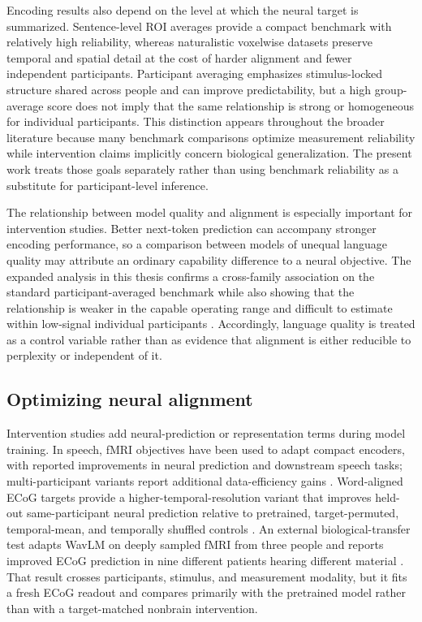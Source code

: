 Encoding results also depend on the level at which the neural target is summarized.
Sentence-level ROI averages provide a compact benchmark with relatively high reliability, whereas naturalistic voxelwise datasets preserve temporal and spatial detail at the cost of harder alignment and fewer independent participants.
Participant averaging emphasizes stimulus-locked structure shared across people and can improve predictability, but a high group-average score does not imply that the same relationship is strong or homogeneous for individual participants.
This distinction appears throughout the broader literature because many benchmark comparisons optimize measurement reliability while intervention claims implicitly concern biological generalization.
The present work treats those goals separately rather than using benchmark reliability as a substitute for participant-level inference.

The relationship between model quality and alignment is especially important for intervention studies.
Better next-token prediction can accompany stronger encoding performance, so a comparison between models of unequal language quality may attribute an ordinary capability difference to a neural objective.
The expanded analysis in this thesis confirms a cross-family association on the standard participant-averaged benchmark while also showing that the relationship is weaker in the capable operating range and difficult to estimate within low-signal individual participants .
Accordingly, language quality is treated as a control variable rather than as evidence that alignment is either reducible to perplexity or independent of it.

\subsection{Optimizing neural alignment}

Intervention studies add neural-prediction or representation terms during model training.
In speech, fMRI objectives have been used to adapt compact encoders, with reported improvements in neural prediction and downstream speech tasks; multi-participant variants report additional data-efficiency gains \autocite{moussa2025,moussa2025b}.
Word-aligned ECoG targets provide a higher-temporal-resolution variant that improves held-out same-participant neural prediction relative to pretrained, target-permuted, temporal-mean, and temporally shuffled controls \autocite{zhang2026}.
An external biological-transfer test adapts WavLM on deeply sampled fMRI from three people and reports improved ECoG prediction in nine different patients hearing different material \autocite{vaidya2026}.
That result crosses participants, stimulus, and measurement modality, but it fits a fresh ECoG readout and compares primarily with the pretrained model rather than with a target-matched nonbrain intervention.

